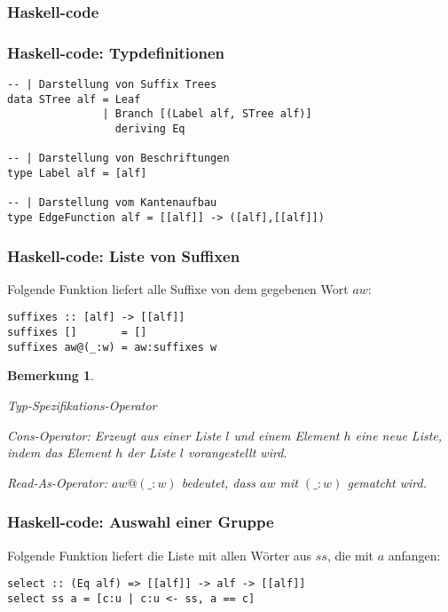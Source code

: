 \documentclass{beamer}
\newtheorem{remark}[theorem]{Bemerkung}
\begin{document}
\subsubsection{Haskell-code}

\begin{frame}[fragile]
\frametitle{Haskell-code: Typdefinitionen}
\begin{lstlisting}
-- | Darstellung von Suffix Trees
data STree alf = Leaf
               | Branch [(Label alf, STree alf)]
                 deriving Eq

-- | Darstellung von Beschriftungen
type Label alf = [alf]

-- | Darstellung vom Kantenaufbau
type EdgeFunction alf = [[alf]] -> ([alf],[[alf]])
\end{lstlisting}
\end{frame}

\begin{frame}[fragile]
\frametitle{Haskell-code: Liste von Suffixen}
Folgende Funktion liefert alle Suffixe von dem gegebenen Wort $aw$:
\begin{lstlisting}
suffixes :: [alf] -> [[alf]]
suffixes []       = []
suffixes aw@(_:w) = aw:suffixes w
\end{lstlisting}
\bigskip
\begin{remark}
\begin{description}[l]
    \item[Operator $(::)$] Typ-Spezifikations-Operator
    \item[Operator $(:)$] Cons-Operator: Erzeugt aus einer Liste $l$ und einem Element $h$ eine neue Liste, indem das Element $h$ der Liste $l$ vorangestellt wird.
    \item[Operator $(@)$] Read-As-Operator: $aw@(\_:w)$ bedeutet, dass $aw$ mit $(\_:w)$ gematcht wird.  
\end{description}
\end{remark}
\end{frame}

\begin{frame}[fragile]
\frametitle{Haskell-code: Auswahl einer Gruppe}
    Folgende Funktion liefert die Liste mit allen Wörter aus $ss$, die mit $a$ anfangen:
\begin{lstlisting}
select :: (Eq alf) => [[alf]] -> alf -> [[alf]]
select ss a = [c:u | c:u <- ss, a == c]
\end{lstlisting}
\bigskip
\end{frame}
\end{document}

